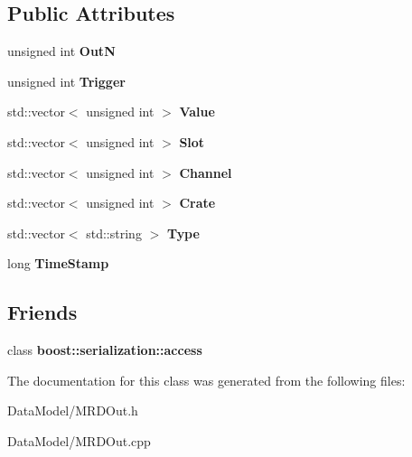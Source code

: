 \subsection*{Public Attributes}
\begin{DoxyCompactItemize}
\item 
\hypertarget{classMRDOut_a99fcd630b69a452e867b30bda86b9d6c}{
unsigned int {\bfseries OutN}}
\label{classMRDOut_a99fcd630b69a452e867b30bda86b9d6c}

\item 
\hypertarget{classMRDOut_aefae0cae9b9149247c66fec5140393af}{
unsigned int {\bfseries Trigger}}
\label{classMRDOut_aefae0cae9b9149247c66fec5140393af}

\item 
\hypertarget{classMRDOut_ae8b80ae7773fb9573a26cf791e18995d}{
std::vector$<$ unsigned int $>$ {\bfseries Value}}
\label{classMRDOut_ae8b80ae7773fb9573a26cf791e18995d}

\item 
\hypertarget{classMRDOut_a03e751accc75934f1ad7926415ce570e}{
std::vector$<$ unsigned int $>$ {\bfseries Slot}}
\label{classMRDOut_a03e751accc75934f1ad7926415ce570e}

\item 
\hypertarget{classMRDOut_a7849667340cd72441d429608ff9b98f9}{
std::vector$<$ unsigned int $>$ {\bfseries Channel}}
\label{classMRDOut_a7849667340cd72441d429608ff9b98f9}

\item 
\hypertarget{classMRDOut_a518db4f65639b83f1e1bcf42f31c1076}{
std::vector$<$ unsigned int $>$ {\bfseries Crate}}
\label{classMRDOut_a518db4f65639b83f1e1bcf42f31c1076}

\item 
\hypertarget{classMRDOut_aa943ba9150d67e2e1758b24324b4ae21}{
std::vector$<$ std::string $>$ {\bfseries Type}}
\label{classMRDOut_aa943ba9150d67e2e1758b24324b4ae21}

\item 
\hypertarget{classMRDOut_a1541d7fe5112f7932ec54b285c13eb08}{
long {\bfseries TimeStamp}}
\label{classMRDOut_a1541d7fe5112f7932ec54b285c13eb08}

\end{DoxyCompactItemize}
\subsection*{Friends}
\begin{DoxyCompactItemize}
\item 
\hypertarget{classMRDOut_ac98d07dd8f7b70e16ccb9a01abf56b9c}{
class {\bfseries boost::serialization::access}}
\label{classMRDOut_ac98d07dd8f7b70e16ccb9a01abf56b9c}

\end{DoxyCompactItemize}


The documentation for this class was generated from the following files:\begin{DoxyCompactItemize}
\item 
DataModel/MRDOut.h\item 
DataModel/MRDOut.cpp\end{DoxyCompactItemize}
